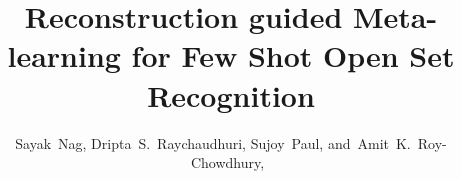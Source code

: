 \documentclass[10pt,journal,compsoc]{IEEEtran}
\begin{document}
%
\title{Reconstruction guided Meta-learning for Few Shot Open Set Recognition}
%
%
%
%

\author{Sayak~Nag,
        Dripta~S.~Raychaudhuri,
        Sujoy~Paul,
        and~Amit~K.~Roy-Chowdhury,~}%
\end{document}
